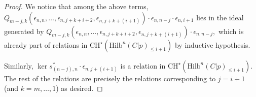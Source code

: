 \documentclass[10pt,a4paper]{amsart}
\newcommand{\Hilb}{\mathrm{Hilb}}
\begin{document}
\begin{proof}
  We notice that among the above terms,  $Q_{m-j, k}(\epsilon_{n,n},\dots, \epsilon_{n, j+k+i+2}, \epsilon_{n, j+k+(i+1)}) \cdot \epsilon_{n,n-j} \cdot \epsilon_{n,i+1}$ lies in the ideal generated by $Q_{m-j, k}(\epsilon_{n,n},\dots, \epsilon_{n, j+k+i+2}, \epsilon_{n, j+k+(i+1)}) \cdot \epsilon_{n,n-j},$ which is already part of relations in $\mathrm{CH}^\star(\Hilb^n(C|p)_{\leq i+1})$ by inductive hypothesis.
  
  Similarly, $\ker s^*_{(n-j),n}\cdot \epsilon_{n,j+(i+1)}$ is a relation in $\mathrm{CH}^\star(\Hilb^n(C|p)_{\leq i+1}).$ The rest of the relations are precisely the relations corresponding to $j = i+1$ (and $k = m,\dots, 1$) as desired.
\end{proof}
\end{document}

